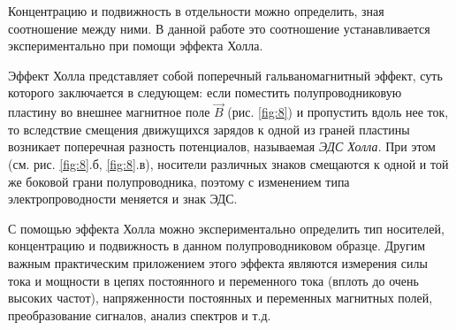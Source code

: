Концентрацию и подвижность в отдельности можно определить, зная соотношение между ними. В данной работе это соотношение
устанавливается экспериментально при помощи эффекта Холла.

Эффект Холла представляет собой поперечный гальваномагнитный эффект, суть которого заключается в следующем: если
поместить полупроводниковую пластину во внешнее магнитное поле $\vec B$ (рис. \ref{fig:8}) и пропустить вдоль нее ток,
то вследствие смещения движущихся зарядов к одной из граней пластины возникает поперечная разность потенциалов,
называемая \textit{ЭДС Холла}. При этом (см. рис. \ref{fig:8}.б, \ref{fig:8}.в), носители различных знаков смещаются к
одной и той же боковой грани полупроводника, поэтому с изменением типа электропроводности меняется и знак ЭДС.

С помощью эффекта Холла можно экспериментально определить тип носителей, концентрацию и подвижность в данном
полупроводниковом образце. Другим важным практическим приложением этого эффекта являются измерения силы тока и мощности
в цепях постоянного и переменного тока  (вплоть до очень высоких частот), напряженности постоянных и переменных
магнитных полей, преобразование сигналов, анализ спектров и т.д.

